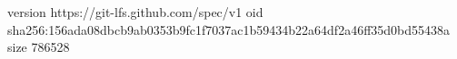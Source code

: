 version https://git-lfs.github.com/spec/v1
oid sha256:156ada08dbcb9ab0353b9fc1f7037ac1b59434b22a64df2a46ff35d0bd55438a
size 786528
